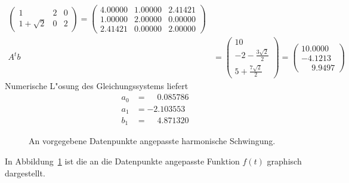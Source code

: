 \begin{loesung}
\begin{align*}
\begin{pmatrix}
         1&2&         0\\
1+\sqrt{2}&0&         2
\end{pmatrix}
=\begin{pmatrix}
   4.00000 & 1.00000 & 2.41421 \\
   1.00000 & 2.00000 & 0.00000 \\
   2.41421 & 0.00000 & 2.00000
\end{pmatrix}
\\
A^tb&=
\begin{pmatrix}
10\\
-2-\frac{3\sqrt{2}}2\\
5+\frac{7\sqrt{2}}2
\end{pmatrix}
=\begin{pmatrix}
10.0000\\
-4.1213\\
\phantom{-}9.9497
\end{pmatrix}
\end{align*}
Numerische L"osung des Gleichungssystems liefert 
\begin{align*}
a_0&=\phantom{-}0.085786\\
a_1&=-2.103553\\
b_1&=\phantom{-}4.871320
\end{align*}
\begin{figure}
\centering
{}
\caption{An vorgegebene Datenpunkte angepasste harmonische Schwingung.
\label{40000034:1}
}
\end{figure}
In Abbildung~\ref{40000034:1} ist die an die Datenpunkte angepasste
Funktion $f(t)$ graphisch dargestellt.
\end{loesung}

